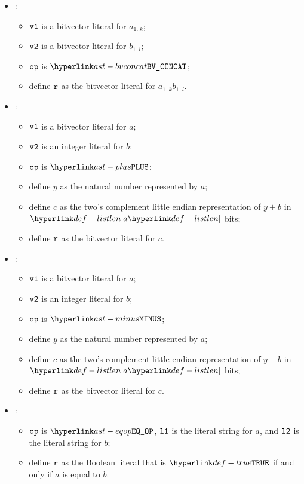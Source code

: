 \begin{itemize}
  \item {}:
  \begin{itemize}
    \item $\texttt{v1}$ is a bitvector literal for $a_{1..k}$;
    \item $\texttt{v2}$ is a bitvector literal for $b_{1..l}$;
    \item $\texttt{op}$ is $\BVCONCAT$;
    \item define $\texttt{r}$ as the bitvector literal for $a_{1..k}b_{1..l}$.
  \end{itemize}

  \item {}:
  \begin{itemize}
    \item $\texttt{v1}$ is a bitvector literal for $a$;
    \item $\texttt{v2}$ is an integer literal for $b$;
    \item $\texttt{op}$ is $\PLUS$;
    \item define $y$ as the natural number represented by $a$;
    \item define $c$ as the two's complement little endian representation of $y+b$ in $\listlen{a}$ bits;
    \item define $\texttt{r}$ as the bitvector literal for $c$.
  \end{itemize}

  \item {}:
  \begin{itemize}
    \item $\texttt{v1}$ is a bitvector literal for $a$;
    \item $\texttt{v2}$ is an integer literal for $b$;
    \item $\texttt{op}$ is $\MINUS$;
    \item define $y$ as the natural number represented by $a$;
    \item define $c$ as the two's complement little endian representation of $y-b$ in $\listlen{a}$ bits;
    \item define $\texttt{r}$ as the bitvector literal for $c$.
  \end{itemize}

  \item {}:
  \begin{itemize}
    \item $\texttt{op}$ is $\EQOP$, $\texttt{l1}$ is the literal string for $a$, and $\texttt{l2}$ is the literal string for $b$;
    \item define $\texttt{r}$ as the Boolean literal that is $\True$ if and only if $a$ is equal to $b$.
  \end{itemize}


\end{itemize}
